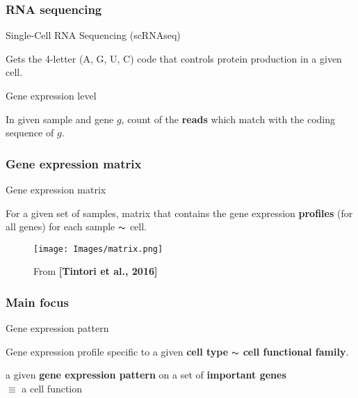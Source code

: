 \documentclass{beamer}
\begin{document}
\begin{frame}
\frametitle{RNA sequencing}

\begin{block}{Single-Cell RNA Sequencing (scRNAseq)}
\begin{center}
Gets the 4-letter (A, G, U, C) code that controls protein production in a given cell. 
\end{center}
\end{block}

\pause
\begin{block}{Gene expression level}
\begin{center}
In given sample and gene $g$, count of the \textbf{reads} which match with the coding sequence of $g$.
\end{center}
\end{block}

\end{frame}

\begin{frame}
\frametitle{Gene expression matrix}

\begin{block}{Gene expression matrix}
\begin{center}
For a given set of samples, matrix that contains the gene expression \textbf{profiles} (for all genes) for each sample $\thicksim$ cell. 
\end{center}
\end{block}

\begin{figure}
\centering
\texttt{[image: Images/matrix.png]}
\caption{From \textbf{[Tintori et al., 2016]}}
\end{figure}
 
\end{frame}

\begin{frame}
\frametitle{Main focus}

\begin{alertblock}{Gene expression pattern}
\begin{center}
Gene expression profile specific to a given \textbf{cell type} $\thicksim$ \textbf{cell functional family}. 
\end{center}
\end{alertblock}

\begin{center}
a given \textbf{gene expression pattern} on a set of \textbf{important genes}\\
$ \equiv $ 
a cell function
\end{center}

\end{frame}
\end{document}
